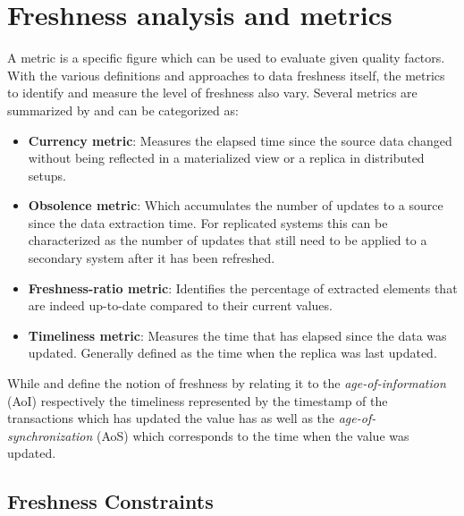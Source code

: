 
\section{Freshness analysis and metrics}
\label{r:freshness_metrics}
A metric is a specific figure which can be used to evaluate given quality factors.
With the various definitions and approaches to data freshness itself, the metrics to identify and measure the level of freshness also vary.
Several metrics are summarized by \cite{cho:2000, pacitti:2000, peralta:2006} and can be categorized as:
\begin{itemize}
    \item \textbf{Currency metric}: Measures the elapsed time since the source data changed without being reflected in a materialized view or a replica in distributed setups.
    \item \textbf{Obsolence metric}: Which accumulates the number of updates to a source since the data extraction time. For replicated systems this can be characterized as the 
    number of updates that still need to be applied to a secondary system after it has been refreshed.
    \item \textbf{Freshness-ratio metric}: Identifies the percentage of extracted elements that are indeed up-to-date compared to their current values.
    \item \textbf{Timeliness metric}: Measures the time that has elapsed since the data was updated. Generally defined as the time when the replica was last updated.
\end{itemize}



While \cite{bedewy:2016} and \cite{zhong:2018} define the notion of freshness by relating it to the \emph{age-of-information} (AoI) respectively the timeliness represented by 
the timestamp of the transactions which has updated the value has as well as the \emph{age-of-synchronization} (AoS) which corresponds to the time when the value was updated.




\subsection{Freshness Constraints}
\label{r:express_freshness}

